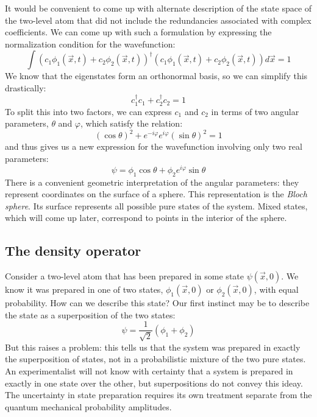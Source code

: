 It would be convenient to come up with alternate description of the state space of the two-level
atom that did not include the redundancies associated with complex coefficients. We can come up with
such a formulation by expressing the normalization condition for the wavefunction:
\begin{equation}
\int \left(c_1 \phi_1\left(\vec{x},t\right) + c_2 \phi_2\left(\vec{x},t\right)\right)^\dagger
    \left(c_1 \phi_1\left(\vec{x},t\right) + c_2 \phi_2\left(\vec{x},t\right)\right) d \vec{x}
    = 1
\end{equation}
We know that the eigenstates form an orthonormal basis, so we can simplify this drastically:
\begin{equation}
c_1^\dagger c_1 + c_2^\dagger c_2 = 1
\end{equation}
To split this into two factors, we can express $c_1$ and $c_2$ in terms of two angular parameters, 
$\theta$ and $\varphi$, which satisfy the relation:
\begin{equation}
\left(\cos\theta\right)^2 + e^{-i\varphi} e^{i\varphi} \left(\sin\theta\right)^2  = 1
\end{equation}
and thus gives us a new expression for the wavefunction involving only two real parameters:
\begin{equation}
\psi = \phi_1 \cos\theta + \phi_2 e^{i\varphi} \sin\theta
\end{equation}
There is a convenient geometric interpretation of the angular parameters: they represent coordinates
on the surface of a sphere. This representation is the \textit{Bloch sphere}. Its surface represents
all possible pure states of the system. Mixed states, which will come up later, correspond to points
in the interior of the sphere.

\subsection{The density operator}

Consider a two-level atom that has been prepared in some state $\psi\left(\vec{x},0\right)$. We know
it was prepared in one of two states, $\phi_1\left(\vec{x},0\right)$ or
$\phi_2\left(\vec{x},0\right)$, with equal probability. How can we describe this state? Our first
instinct may be to describe the state as a superposition of the two states:
\begin{equation}
\psi = \frac{1}{\sqrt{2}}\left(\phi_1 + \phi_2\right)
\end{equation}
But this raises a problem: this tells us that the system was prepared in exactly the superposition
of states, not in a probabilistic mixture of the two pure states. An experimentalist will not know
with certainty that a system is prepared in exactly in one state over the other, but superpositions
do not convey this ideay. The uncertainty in state preparation requires its own treatment separate
from the quantum mechanical probability amplitudes.

